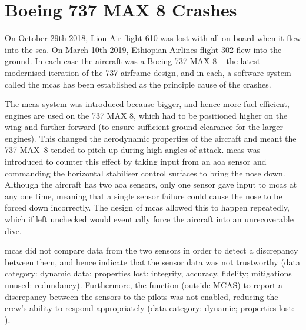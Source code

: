 \section{Boeing 737 MAX 8 Crashes} \label{bkm:incacc:737max8}

On October 29th 2018, Lion Air flight 610 was lost with all on board when it flew into the sea. On March 10th 2019, Ethiopian Airlines flight 302 flew into the ground. In each case the aircraft was a Boeing 737 MAX 8 -- the latest modernised iteration of the 737 airframe design, and in each, a software system called the \gls{mcas} has been established as the principle cause of the crashes.

The \gls{mcas} system was introduced because bigger, and hence more fuel efficient, engines are used on the 737 MAX 8, which had to be positioned higher on the wing and further forward (to ensure sufficient ground clearance for the larger engines). This changed the aerodynamic properties of the aircraft and meant the 737 MAX~8 tended to pitch up during high angles of attack. \Gls{mcas} was introduced to counter this effect by taking input from an \gls{aoa} sensor and commanding the horizontal stabiliser control surfaces to bring the nose down. Although the aircraft has two \gls{aoa} sensors, only one sensor gave input to \gls{mcas} at any one time, meaning that a single sensor failure could cause the nose to be forced down incorrectly. The design of \gls{mcas} allowed this to happen repeatedly, which if left unchecked would eventually force the aircraft into an unrecoverable dive.

\Gls{mcas} did not compare data from the two sensors in order to detect a discrepancy between them, and hence indicate that the sensor data was not trustworthy (data category: {dynamic data}; properties lost: \gls{integrity}, \gls{accuracy}, \gls{fidelity}; \glspl{mitigation} unused: redundancy). Furthermore, the function (outside MCAS) to report a discrepancy between the sensors to the pilots was not enabled, reducing the crew's ability to respond appropriately (data category: dynamic; properties lost: ).

